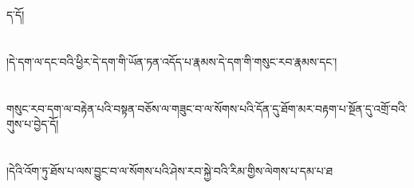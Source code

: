 ད་དོ།\chapter{ }།དེ་དག་ལ་དང་བའི་ཕྱིར་དེ་དག་གི་ཡོན་ཏན་འདོད་པ་རྣམས་དེ་དག་གི་གསུང་རབ་རྣམས་དང་།\chapter{ }གསུང་རབ་དག་ལ་བརྟེན་པའི་བསྟན་བཅོས་ལ་གཟུང་བ་ལ་སོགས་པའི་དོན་དུ་ཐོག་མར་བརྟག་པ་སྔོན་དུ་འགྲོ་བའི་གུས་པ་བྱེད་དོ།\chapter{ }།དེའི་འོག་ཏུ་ཐོས་པ་ལས་བྱུང་བ་ལ་སོགས་པའི་ཤེས་རབ་སྐྱེ་བའི་རིམ་གྱིས་ལེགས་པ་དམ་པ་ཐ